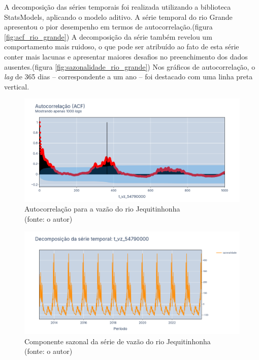 A decomposição das séries temporais foi realizada utilizando a biblioteca StatsModels, aplicando o modelo aditivo.\cite{seabold2010statsmodels} A série temporal do rio Grande apresentou o pior desempenho em termos de autocorrelação.(figura \ref{fig:acf_rio_grande}) A decomposição da série também revelou um comportamento mais ruidoso, o que pode ser atribuído ao fato de esta série conter mais lacunas e apresentar maiores desafios no preenchimento dos dados ausentes.(figura \ref{fig:sazonalidade_rio_grande}) Nos gráficos de autocorrelação, o \textit{lag} de 365 dias – correspondente a um ano – foi destacado com uma linha preta vertical.

\begin{figure}[!h]
	\centering
	\includegraphics[scale=0.33]{Figuras/jequiti/acf_jequitinhonha.png}
	\caption{Autocorrelação para a vazão do rio Jequitinhonha\\(fonte: o autor)}
	\label{fig:acf_jequitinhonha}
\end{figure}

\begin{figure}[!h]
	\centering
	\includegraphics[scale=0.33]{Figuras/jequiti/sazonalidade_jequitinhonha.png}
	\caption{Componente sazonal da série de vazão do rio Jequitinhonha\\(fonte: o autor)}
	\label{fig:sazonalidade_jequitinhonha}
\end{figure}

